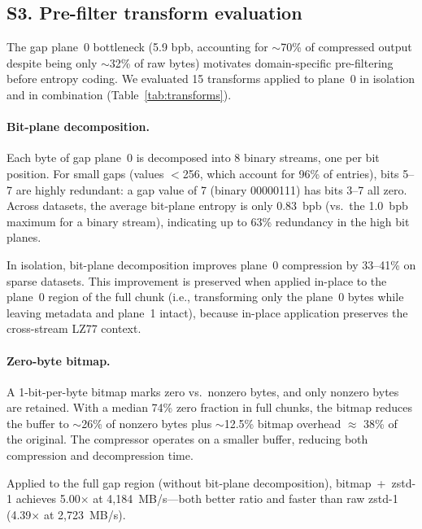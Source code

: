 \documentclass[10pt,twocolumn,letterpaper]{article}
\begin{document}
\subsection*{S3. Pre-filter transform evaluation}

The gap plane~0 bottleneck (5.9 bpb, accounting for $\sim$70\% of compressed output despite being only $\sim$32\% of raw bytes) motivates domain-specific pre-filtering before entropy coding.
We evaluated 15 transforms applied to plane~0 in isolation and in combination (Table~\ref{tab:transforms}).

\paragraph{Bit-plane decomposition.}
Each byte of gap plane~0 is decomposed into 8 binary streams, one per bit position.
For small gaps (values $<$256, which account for 96\% of entries), bits 5--7 are highly redundant: a gap value of 7 (binary 00000111) has bits 3--7 all zero.
Across datasets, the average bit-plane entropy is only 0.83~bpb (vs.\ the 1.0~bpb maximum for a binary stream), indicating up to 63\% redundancy in the high bit planes.

In isolation, bit-plane decomposition improves plane~0 compression by 33--41\% on sparse datasets.
This improvement is preserved when applied in-place to the plane~0 region of the full chunk (i.e., transforming only the plane~0 bytes while leaving metadata and plane~1 intact), because in-place application preserves the cross-stream LZ77 context.

\paragraph{Zero-byte bitmap.}
A 1-bit-per-byte bitmap marks zero vs.\ nonzero bytes, and only nonzero bytes are retained.
With a median 74\% zero fraction in full chunks, the bitmap reduces the buffer to $\sim$26\% of nonzero bytes plus $\sim$12.5\% bitmap overhead $\approx$ 38\% of the original.
The compressor operates on a smaller buffer, reducing both compression and decompression time.

Applied to the full gap region (without bit-plane decomposition), bitmap~+~zstd-1 achieves 5.00$\times$ at 4{,}184~MB/s---both better ratio and faster than raw zstd-1 (4.39$\times$ at 2{,}723~MB/s).
\end{document}

